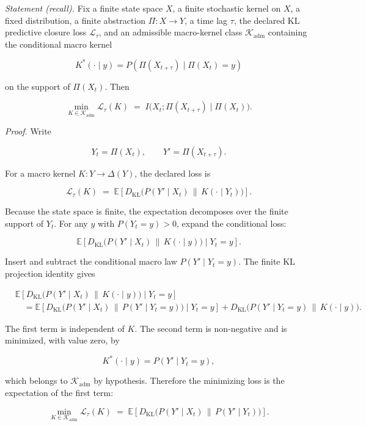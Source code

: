\documentclass[11pt]{article}
\theoremstyle{definition}
\begin{document}
\emph{Statement (recall).} Fix a finite state space \(X\), a finite stochastic kernel on \(X\), a fixed distribution, a finite abstraction \(\Pi:X\to Y\), a time lag \(\tau\), the declared KL predictive closure loss \(\mathcal L_\tau\), and an admissible macro-kernel class \(\mathcal K_{\mathrm{adm}}\) containing the conditional macro kernel

\[
K^\ast(\cdot\mid y)=P(\Pi(X_{t+\tau})\mid\Pi(X_t)=y)
\]

on the support of \(\Pi(X_t)\). Then

\[
\min_{K\in\mathcal K_{\mathrm{adm}}}\mathcal L_\tau(K)
\;=\;
I\bigl(X_t;\Pi(X_{t+\tau})\mid\Pi(X_t)\bigr).
\]

\emph{Proof.} Write

\[
Y_t=\Pi(X_t),\qquad Y'=\Pi(X_{t+\tau}).
\]

For a macro kernel \(K:Y\to\Delta(Y)\), the declared loss is

\[
\mathcal L_\tau(K)
\;=\;
\mathbb E\!\left[
D_{\mathrm{KL}}\bigl(P(Y'\mid X_t)\,\|\,K(\cdot\mid Y_t)\bigr)
\right].
\]

Because the state space is finite, the expectation decomposes over the finite support of \(Y_t\). For any \(y\) with \(P(Y_t=y)>0\), expand the conditional loss:

\[
\mathbb E\!\left[
D_{\mathrm{KL}}\bigl(P(Y'\mid X_t)\,\|\,K(\cdot\mid y)\bigr)
\mid Y_t=y
\right].
\]

Insert and subtract the conditional macro law \(P(Y'\mid Y_t=y)\). The finite KL projection identity gives

\[
\begin{aligned}
&\mathbb E\!\left[
D_{\mathrm{KL}}\bigl(P(Y'\mid X_t)\,\|\,K(\cdot\mid y)\bigr)
\mid Y_t=y
\right] \\
&\quad =
\mathbb E\!\left[
D_{\mathrm{KL}}\bigl(P(Y'\mid X_t)\,\|\,P(Y'\mid Y_t=y)\bigr)
\mid Y_t=y
\right]
+D_{\mathrm{KL}}\bigl(P(Y'\mid Y_t=y)\,\|\,K(\cdot\mid y)\bigr).
\end{aligned}
\]

The first term is independent of \(K\). The second term is non-negative and is minimized, with value zero, by

\[
K^\ast(\cdot\mid y)=P(Y'\mid Y_t=y),
\]

which belongs to \(\mathcal K_{\mathrm{adm}}\) by hypothesis. Therefore the minimizing loss is the expectation of the first term:

\[
\min_{K\in\mathcal K_{\mathrm{adm}}}\mathcal L_\tau(K)
\;=\;
\mathbb E\!\left[
D_{\mathrm{KL}}\bigl(P(Y'\mid X_t)\,\|\,P(Y'\mid Y_t)\bigr)
\right].
\]
\end{document}
